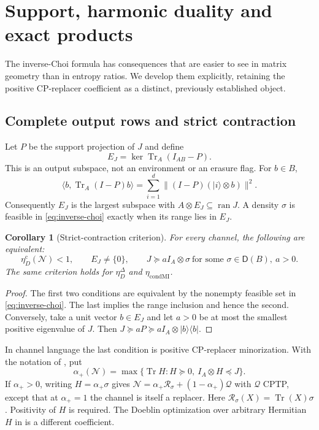 \documentclass[11pt]{article}
\numberwithin{equation}{section}
\newtheorem{corollary}[theorem]{Corollary}
\theoremstyle{definition}
\theoremstyle{remark}
\DeclareMathOperator{\Tr}{Tr}
\DeclareMathOperator{\ran}{ran}
\newcommand{\N}{\mathcal N}
\newcommand{\ket}[1]{\lvert #1\rangle}
\newcommand{\bra}[1]{\langle #1\rvert}
\newcommand{\ip}[2]{\langle #1,#2\rangle}
\newcommand{\norm}[1]{\lVert #1\rVert}
\newcommand{\etaC}{\eta_D^{\mathrm c}}
\newcommand{\etaDel}{\eta_D^{\Delta}}
\newcommand{\etaCM}{\eta_{\mathrm{condMI}}}
\newcommand{\States}{\mathsf D}
\begin{document}
\section{Support, harmonic duality and exact products}
\label{sec:geometry}

The inverse-Choi formula has consequences that are easier to see in matrix
geometry than in entropy ratios. We develop them explicitly, retaining the
positive CP-replacer coefficient as a distinct, previously established object.

\subsection{Complete output rows and strict contraction}

Let $P$ be the support projection of $J$ and define
\begin{equation}
 E_J=\ker\Tr_A(I_{AB}-P).
 \label{eq:complete-row-space}
\end{equation}
This is an output subspace, not an environment or an erasure flag.
For $b\in B$,
\[
 \ip b{\Tr_A(I-P)b}
 =\sum_{i=1}^d\norm{(I-P)(\ket i\otimes b)}^2.
\]
Consequently $E_J$ is the largest subspace with
$A\otimes E_J\subseteq\ran J$.
A density $\sigma$ is feasible in \eqref{eq:inverse-choi} exactly when
its range lies in $E_J$.

\begin{corollary}[Strict-contraction criterion]
\label{cor:strict}
For every channel, the following are equivalent:
\[
 \etaC(\N)<1,\qquad
 E_J\ne\{0\},\qquad
 J\succeq a I_A\otimes\sigma
 \ \text{for some }\sigma\in\States(B),\ a>0 .
\]
The same criterion holds for $\etaDel$ and $\etaCM$.
\end{corollary}
\begin{proof}
The first two conditions are equivalent by the nonempty feasible set in
\eqref{eq:inverse-choi}. The last implies the range inclusion and hence
the second. Conversely, take a unit vector $b\in E_J$ and let $a>0$
be at most the smallest positive eigenvalue of $J$. Then
$J\succeq aP\succeq aI_A\otimes\ket b\bra b$.
\end{proof}

In channel language the last condition is positive CP-replacer minorization.
With the notation of \cite[Definition~7, equation~(3.25)]{GHNW26}, put
\begin{equation}
 \alpha_+(\N)=\max\{\Tr H:H\succeq0,\ I_A\otimes H\preceq J\}.
 \label{eq:positive-doeblin}
\end{equation}
If $\alpha_+>0$, writing $H=\alpha_+\sigma$ gives
$\N=\alpha_+\mathcal R_\sigma+(1-\alpha_+)\mathcal Q$ with $\mathcal Q$
CPTP, except that at $\alpha_+=1$ the channel is itself a replacer.
Here $\mathcal R_\sigma(X)=\Tr(X)\sigma$.
Positivity of $H$ is required. The Doeblin optimization over arbitrary
Hermitian $H$ in \cite{GHNW26} is a different coefficient.
\end{document}
